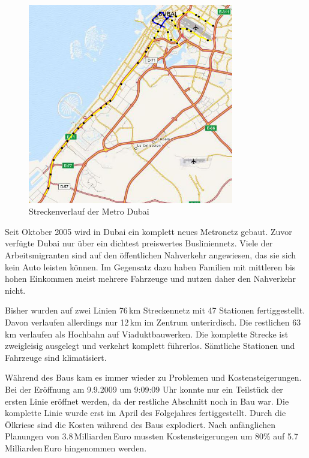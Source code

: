 \begin{figure}[h]
  \begin{center}
    \includegraphics[width=0.8\textwidth]{maps/Dubai.png}
    \caption{Streckenverlauf der Metro Dubai}
  \end{center}
\end{figure}

Seit Oktober 2005 wird in Dubai ein komplett neues Metronetz
gebaut. Zuvor verfügte Dubai nur über ein dichtest preiswertes
Busliniennetz. Viele der Arbeitsmigranten sind auf den öffentlichen
Nahverkehr angewiesen, das sie sich kein Auto leisten können. Im
Gegensatz dazu haben Familien mit mittleren bis hohen Einkommen meist
mehrere Fahrzeuge und nutzen daher den Nahverkehr nicht.

Bisher wurden auf zwei Linien 76\,km Streckennetz mit 47 Stationen
fertiggestellt. Davon verlaufen allerdings nur 12\,km im Zentrum
unterirdisch. Die restlichen 63\,km verlaufen als Hochbahn auf
Viaduktbauwerken. Die komplette Strecke ist zweigleisig ausgelegt und
verkehrt komplett führerlos. Sämtliche Stationen und Fahrzeuge sind
klimatisiert. \cite{hallodubai}

Während des Baus kam es immer wieder zu Problemen und
Kostensteigerungen. Bei der Eröffnung am 9.9.2009 um 9:09:09 Uhr
konnte nur ein Teilstück der ersten Linie eröffnet werden, da der
restliche Abschnitt noch in Bau war. \cite{tnDubaiMetro} Die komplette
Linie wurde erst im April des Folgejahres fertiggestellt. Durch die
Ölkriese sind die Kosten während des Baus explodiert. Nach
anfänglichen Planungen von 3.8\,Milliarden\,Euro mussten
Kostensteigerungen um 80\% auf 5.7\,Milliarden\,Euro hingenommen
werden. \cite{gnCosts}



